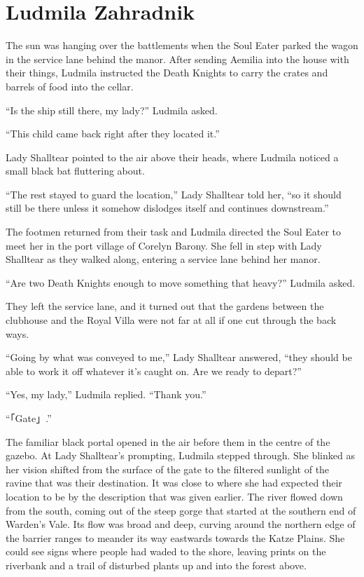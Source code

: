 \chapter{Ludmila Zahradnik}

The sun was hanging over the battlements when the Soul Eater parked the wagon in the service lane behind the manor. After sending Aemilia into the house with their things, Ludmila instructed the Death Knights to carry the crates and barrels of food into the cellar.

 

“Is the ship still there, my lady?” Ludmila asked.

 

“This child came back right after they located it.”

 

Lady Shalltear pointed to the air above their heads, where Ludmila noticed a small black bat fluttering about.

 

“The rest stayed to guard the location,” Lady Shalltear told her, “so it should still be there unless it somehow dislodges itself and continues downstream.”

 

The footmen returned from their task and Ludmila directed the Soul Eater to meet her in the port village of Corelyn Barony. She fell in step with Lady Shalltear as they walked along, entering a service lane behind her manor.

 

“Are two Death Knights enough to move something that heavy?” Ludmila asked.

 

They left the service lane, and it turned out that the gardens between the clubhouse and the Royal Villa were not far at all if one cut through the back ways.

 

“Going by what was conveyed to me,” Lady Shalltear answered, “they should be able to work it off whatever it’s caught on. Are we ready to depart?”

 

“Yes, my lady,” Ludmila replied. “Thank you.”

 

“「Gate」.”

 

The familiar black portal opened in the air before them in the centre of the gazebo. At Lady Shalltear’s prompting, Ludmila stepped through. She blinked as her vision shifted from the surface of the gate to the filtered sunlight of the ravine that was their destination. It was close to where she had expected their location to be by the description that was given earlier. The river flowed down from the south, coming out of the steep gorge that started at the southern end of Warden’s Vale. Its flow was broad and deep, curving around the northern edge of the barrier ranges to meander its way eastwards towards the Katze Plains. She could see signs where people had waded to the shore, leaving prints on the riverbank and a trail of disturbed plants up and into the forest above.

